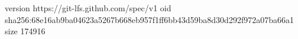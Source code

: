 version https://git-lfs.github.com/spec/v1
oid sha256:68e16ab9ba04623a5267b668eb957f1ff6bb43d59ba8d30d292f972a07ba66a1
size 174916
